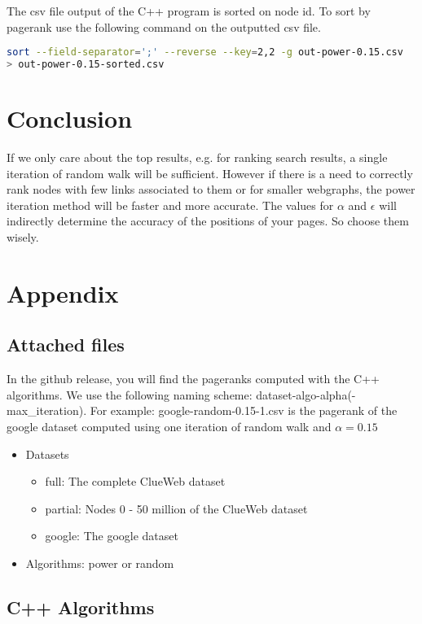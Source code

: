 \documentclass{article}
\begin{document}
The csv file output of the C++ program is sorted on node id. To sort by pagerank use the following command on the outputted csv file.
\begin{lstlisting}[language=sh]
sort --field-separator=';' --reverse --key=2,2 -g out-power-0.15.csv 
> out-power-0.15-sorted.csv
\end{lstlisting}

\section{Conclusion}
If we only care about the top results, e.g. for ranking search results, a single iteration of random walk will be sufficient. However if there is a need to correctly rank nodes with few links associated to them or for smaller webgraphs, the power iteration method will be faster and more accurate. The values for $\alpha$ and $\epsilon$ will indirectly determine the accuracy of the positions of your pages. So choose them wisely.

\nocite{*} 
\printbibliography

\appendix
\section{Appendix}
\subsection{Attached files}
In the github release, you will find the pageranks computed with the C++ algorithms. We use the following naming scheme:
dataset-algo-alpha(-max\_iteration). For example:
google-random-0.15-1.csv is the pagerank of the google dataset computed using one iteration of random walk and $\alpha = 0.15$

\begin{itemize}
    \item Datasets
    \begin{itemize}
        \item full: The complete ClueWeb dataset
        \item partial: Nodes 0 - 50 million of the ClueWeb dataset
        \item google: The google dataset
    \end{itemize}
    \item Algorithms: power or random
\end{itemize}
\pagebreak
\subsection{C++ Algorithms}
\end{document}
